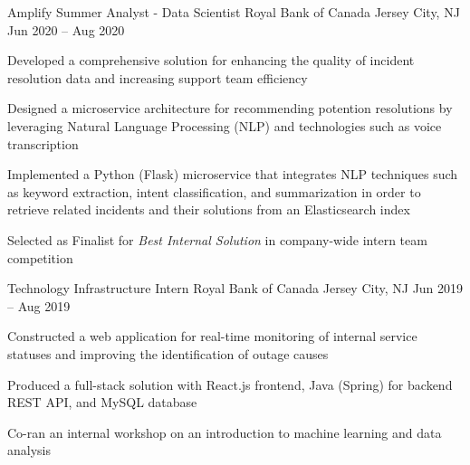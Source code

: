 

\begin{cventries}

  \cventry
	{Amplify Summer Analyst - Data Scientist}
	{Royal Bank of Canada}
	{Jersey City, NJ}
	{Jun 2020 – Aug 2020}
	{
    \begin{cvitems}
		  \item {Developed a comprehensive solution for enhancing the quality of incident resolution data and increasing support team efficiency}
      \item {Designed a microservice architecture for recommending potention resolutions by leveraging Natural Language Processing (NLP) \newline 
      and technologies such as voice transcription}
      \item {Implemented a Python (Flask) microservice that integrates NLP techniques such as keyword extraction, intent classification, and \newline 
      summarization in order to retrieve related incidents and their solutions from an Elasticsearch index}
		  \item {Selected as Finalist for \emph{Best Internal Solution} in company-wide intern team competition}
    \end{cvitems}
  }
  
  
  \cventry
  {Technology Infrastructure Intern}
  {Royal Bank of Canada}
  {Jersey City, NJ}
  {Jun 2019 -- Aug 2019}
  {
    \begin{cvitems}
      \item {Constructed a web application for real-time monitoring of internal service statuses and improving the identification of outage causes}
      \item {Produced a full-stack solution with React.js frontend, Java (Spring) for backend REST API, and MySQL database}
      \item {Co-ran an internal workshop on an introduction to machine learning and data analysis}
    \end{cvitems}
  }



\end{cventries}
